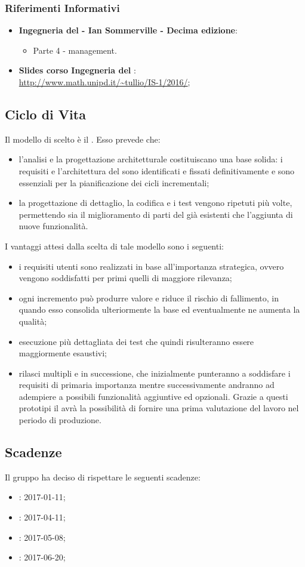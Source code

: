 	    \subsubsection{Riferimenti Informativi}
	    	\begin{itemize}
	    		\item \textbf{Ingegneria del  - Ian Sommerville - Decima edizione}:
	    		\begin{itemize}
	    			\item Parte 4 -  management.
	    		\end{itemize}
	    		\item \textbf{Slides corso Ingegneria del }: \\ \url{http://www.math.unipd.it/~tullio/IS-1/2016/};
	    	\end{itemize}
	    
	    \subsection{Ciclo di Vita}
	    Il modello di  scelto è il . Esso prevede che:
	    \begin{itemize}
	    	\item l'analisi e la progettazione architetturale costituiscano una base solida: i requisiti e l'architettura del  sono identificati e fissati definitivamente e sono essenziali per la pianificazione dei cicli incrementali;
	    	\item la progettazione di dettaglio, la codifica e i test vengono ripetuti più volte, permettendo sia il miglioramento di parti del  già esistenti che l'aggiunta di nuove funzionalità.
	    \end{itemize}
	    I vantaggi attesi dalla scelta di tale modello sono i seguenti:
	    \begin{itemize}
	    	\item i requisiti utenti sono realizzati in base all'importanza strategica, ovvero vengono soddisfatti per primi quelli di maggiore rilevanza;
	    	\item ogni incremento può produrre valore e riduce il rischio di fallimento, in quando esso consolida ulteriormente la base ed eventualmente ne aumenta la qualità;
	    	\item esecuzione più dettagliata dei test che quindi risulteranno essere maggiormente esaustivi;
	    	\item rilasci multipli e in successione, che inizialmente punteranno a soddisfare i requisiti di primaria importanza mentre successivamente andranno ad adempiere a possibili funzionalità aggiuntive ed opzionali. Grazie a questi prototipi il  avrà la possibilità di fornire una prima valutazione del lavoro nel periodo di produzione.
	    \end{itemize}
	    \subsection{Scadenze}
	    Il gruppo \AUTORE{} ha deciso di rispettare le seguenti scadenze:
	    \begin{itemize}
			\item \RR{}: 2017-01-11;
			\item \RP{}: 2017-04-11;
			\item \RQ{}: 2017-05-08;
			\item \RA{}: 2017-06-20;
	    \end{itemize}